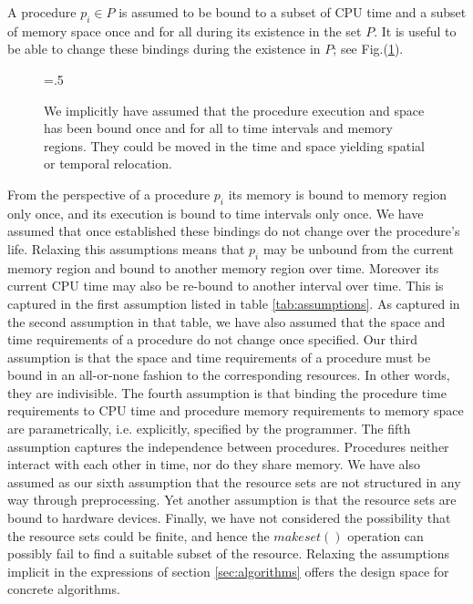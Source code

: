 \documentclass[draft]{article}
\def\figdir{.}
\begin{document}
A procedure $p_i \in P$ is assumed to be bound to a subset of CPU time
and a subset of memory space  once and for all during its existence in
the set $P$.  It is useful  to be able to change these bindings during
the existence in  $P$; see Fig.(\ref{fig:moving:time:space}).
\begin{figure}[h]
  \centering
  \epsfxsize=.5\textwidth
  \epsffile{\figdir/moving-time-space-bindings.eps}
  \caption[Relocating bindings  in time and  space]{We implicitly have
    assumed that the procedure execution and space has been bound once
    and for all  to time intervals and memory  regions.  They could be
    moved  in  the  time   and  space  yielding  spatial  or  temporal
    relocation.}
  \label{fig:moving:time:space}
\end{figure}
From  the perspective  of a  procedure $p_i$  its memory  is  bound to
memory region only once, and  its execution is bound to time intervals
only once.   We have assumed  that once established these  bindings do
not change over the procedure's life.  Relaxing this assumptions means
that $p_i$ may be unbound from  the current memory region and bound to
another memory  region over time.   Moreover its current CPU  time may
also be re-bound  to another interval over time.   This is captured in
the  first  assumption  listed  in  table  \ref{tab:assumptions}.   As
captured in the second assumption  in that table, we have also assumed
that the space and time requirements of a procedure do not change once
specified.   Our   third  assumption  is  that  the   space  and  time
requirements of a procedure must be bound in an all-or-none fashion to
the corresponding  resources.  In  other words, they  are indivisible.
The fourth assumption is  that binding the procedure time requirements
to  CPU time  and procedure  memory requirements  to memory  space are
parametrically,  i.e. explicitly, specified  by the  programmer.  The
fifth  assumption   captures  the  independence   between  procedures.
Procedures neither interact with each other in time, nor do they share
memory.   We  have also  assumed  as  our  sixth assumption  that  the
resource  sets are not  structured in  any way  through preprocessing.
Yet another assumption is that the resource sets are bound to hardware
devices.   Finally, we have  not considered  the possibility  that the
resource sets could be finite, and hence the $makeset()$ operation can
possibly fail to find a suitable subset of the resource.  Relaxing the
assumptions    implicit     in    the    expressions     of    section
\ref{sec:algorithms} offers the design space for concrete algorithms.
\end{document}
